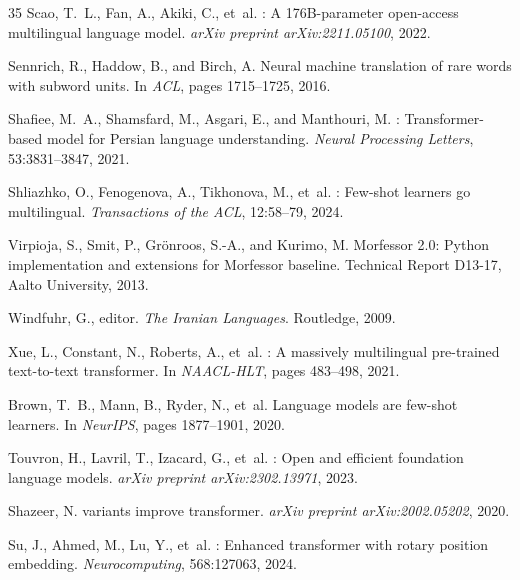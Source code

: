 \documentclass[11pt,a4paper]{article}
\begin{document}
\begin{thebibliography}{35}
Scao, T.~L., Fan, A., Akiki, C., et~al.
: A 176{B}-parameter open-access multilingual language model.
\newblock \emph{arXiv preprint arXiv:2211.05100}, 2022.

Sennrich, R., Haddow, B., and Birch, A.
\newblock Neural machine translation of rare words with subword units.
\newblock In \emph{ACL}, pages 1715--1725, 2016.

Shafiee, M.~A., Shamsfard, M., Asgari, E., and Manthouri, M.
: Transformer-based model for {Persian} language understanding.
\newblock \emph{Neural Processing Letters}, 53:3831--3847, 2021.

Shliazhko, O., Fenogenova, A., Tikhonova, M., et~al.
: Few-shot learners go multilingual.
\newblock \emph{Transactions of the ACL}, 12:58--79, 2024.

Virpioja, S., Smit, P., Gr\"onroos, S.-A., and Kurimo, M.
\newblock Morfessor 2.0: {Python} implementation and extensions for {Morfessor} baseline.
\newblock Technical Report D13-17, Aalto University, 2013.

Windfuhr, G., editor.
\newblock \emph{The {Iranian} Languages}.
\newblock Routledge, 2009.

Xue, L., Constant, N., Roberts, A., et~al.
: A massively multilingual pre-trained text-to-text transformer.
\newblock In \emph{NAACL-HLT}, pages 483--498, 2021.

Brown, T.~B., Mann, B., Ryder, N., et~al.
\newblock Language models are few-shot learners.
\newblock In \emph{NeurIPS}, pages 1877--1901, 2020.

Touvron, H., Lavril, T., Izacard, G., et~al.
: Open and efficient foundation language models.
\newblock \emph{arXiv preprint arXiv:2302.13971}, 2023.

Shazeer, N.
 variants improve transformer.
\newblock \emph{arXiv preprint arXiv:2002.05202}, 2020.

Su, J., Ahmed, M., Lu, Y., et~al.
: Enhanced transformer with rotary position embedding.
\newblock \emph{Neurocomputing}, 568:127063, 2024.


\end{thebibliography}
\end{document}
